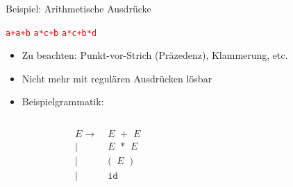 \documentclass{beamer}
\begin{document}
\begin{frame}{Beispiel: Arithmetische Ausdrücke}
  \begin{center}
    \textcolor<1>{red}{\texttt{a+a+b}} \hfill \textcolor<2>{red}{\texttt{a*c+b}} \hfill \textcolor<3>{red}{\texttt{a*c+b*d}}
  \end{center}

    \begin{itemize}
      \item Zu beachten: Punkt-vor-Strich (Präzedenz), Klammerung, etc.
      \item Nicht mehr mit regulären Ausdrücken lösbar
      \item Beispielgrammatik:
    \end{itemize}

    \begin{columns}
      \begin{column}{0.5\textwidth}
        \begin{align*}
          E \to & \; E \;\; \texttt{+} \;\; E \\
           \mid & \; E \;\; \texttt{*} \;\; E \\
           \mid & \; \texttt{(} \;\; E \;\; \texttt{)} \\
           \mid & \; \texttt{id}
        \end{align*}
      \end{column}
      \begin{column}{0.5\textwidth}
\end{column}
\end{columns}
\end{frame}
\end{document}
